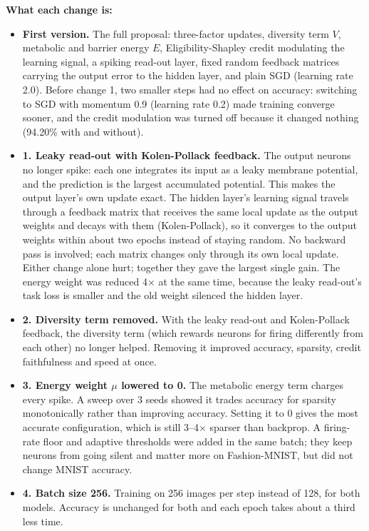 {\small
\noindent\textbf{What each change is:}
\begin{itemize}
  \item \textbf{First version.} The full proposal: three-factor updates, diversity term $V$, metabolic and barrier energy $E$, Eligibility-Shapley credit modulating the learning signal, a spiking read-out layer, fixed random feedback matrices carrying the output error to the hidden layer, and plain SGD (learning rate 2.0). Before change 1, two smaller steps had no effect on accuracy: switching to SGD with momentum 0.9 (learning rate 0.2) made training converge sooner, and the credit modulation was turned off because it changed nothing (94.20\% with and without).
  \item \textbf{1. Leaky read-out with Kolen-Pollack feedback.} The output neurons no longer spike: each one integrates its input as a leaky membrane potential, and the prediction is the largest accumulated potential. This makes the output layer's own update exact. The hidden layer's learning signal travels through a feedback matrix that receives the same local update as the output weights and decays with them (Kolen-Pollack), so it converges to the output weights within about two epochs instead of staying random. No backward pass is involved; each matrix changes only through its own local update. Either change alone hurt; together they gave the largest single gain. The energy weight was reduced 4$\times$ at the same time, because the leaky read-out's task loss is smaller and the old weight silenced the hidden layer.
  \item \textbf{2. Diversity term removed.} With the leaky read-out and Kolen-Pollack feedback, the diversity term (which rewards neurons for firing differently from each other) no longer helped. Removing it improved accuracy, sparsity, credit faithfulness and speed at once.
  \item \textbf{3. Energy weight $\mu$ lowered to 0.} The metabolic energy term charges every spike. A sweep over 3 seeds showed it trades accuracy for sparsity monotonically rather than improving accuracy. Setting it to 0 gives the most accurate configuration, which is still 3--4$\times$ sparser than backprop. A firing-rate floor and adaptive thresholds were added in the same batch; they keep neurons from going silent and matter more on Fashion-MNIST, but did not change MNIST accuracy.
  \item \textbf{4. Batch size 256.} Training on 256 images per step instead of 128, for both models. Accuracy is unchanged for both and each epoch takes about a third less time.

\end{itemize}}
